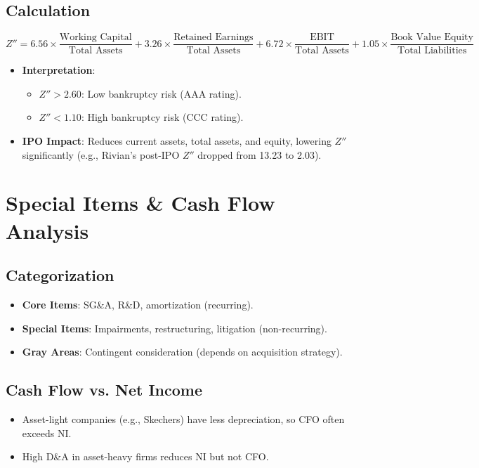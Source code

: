 \documentclass{article}
\begin{document}
\subsection{Calculation}
\[
Z'' = 6.56 \times \frac{\text{Working Capital}}{\text{Total Assets}} + 3.26 \times \frac{\text{Retained Earnings}}{\text{Total Assets}} + 6.72 \times \frac{\text{EBIT}}{\text{Total Assets}} + 1.05 \times \frac{\text{Book Value Equity}}{\text{Total Liabilities}}
\]
\begin{itemize}
    \item \textbf{Interpretation}:
    \begin{itemize}
        \item $Z'' > 2.60$: Low bankruptcy risk (AAA rating).
        \item $Z'' < 1.10$: High bankruptcy risk (CCC rating).
    \end{itemize}
    \item \textbf{IPO Impact}: Reduces current assets, total assets, and equity, lowering $Z''$ significantly (e.g., Rivian’s post-IPO $Z''$ dropped from 13.23 to 2.03).
\end{itemize}

\section{Special Items \& Cash Flow Analysis}
\subsection{Categorization}
\begin{itemize}
    \item \textbf{Core Items}: SG\&A, R\&D, amortization (recurring).
    \item \textbf{Special Items}: Impairments, restructuring, litigation (non-recurring).
    \item \textbf{Gray Areas}: Contingent consideration (depends on acquisition strategy).
\end{itemize}

\subsection{Cash Flow vs. Net Income}
\begin{itemize}
    \item Asset-light companies (e.g., Skechers) have less depreciation, so CFO often exceeds NI.
    \item High D\&A in asset-heavy firms reduces NI but not CFO.
\end{itemize}
\end{document}
